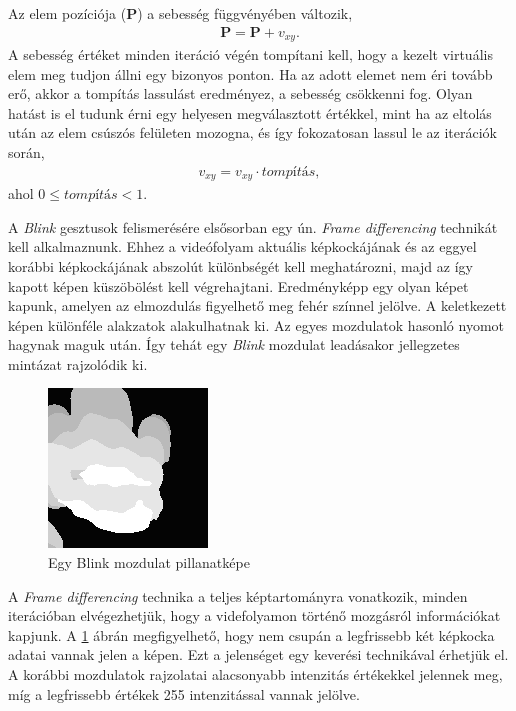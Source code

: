 Az elem pozíciója ($\boldsymbol P$) a sebesség függvényében változik,
\begin{align*}
  \boldsymbol P = \boldsymbol P+v_{xy}.
\end{align*}
A sebesség értéket minden iteráció végén tompítani kell, hogy a kezelt virtuális elem meg tudjon állni egy bizonyos ponton. Ha az adott elemet nem éri tovább erő, akkor a tompítás lassulást eredményez, a sebesség csökkenni fog. Olyan hatást is el tudunk érni egy helyesen megválasztott értékkel, mint ha az eltolás után az elem csúszós felületen mozogna, és így fokozatosan lassul le az iterációk során,
\begin{align*}
  v_{xy} = v_{xy} \cdot \textit{tompítás},
\end{align*}
ahol $0 \leq \textit{tompítás} < 1$.


A \textit{Blink} gesztusok felismerésére elsősorban egy ún. \textit{Frame differencing} technikát kell alkalmaznunk.
Ehhez a videófolyam aktuális képkockájának és az eggyel korábbi képkockájának abszolút különbségét kell meghatározni, majd az így kapott képen küszöbölést kell végrehajtani. Eredményképp egy olyan képet kapunk, amelyen az elmozdulás figyelhető meg fehér színnel jelölve. A keletkezett képen különféle alakzatok alakulhatnak ki. Az egyes mozdulatok hasonló nyomot hagynak maguk után. Így tehát egy \textit{Blink} mozdulat leadásakor jellegzetes mintázat rajzolódik ki.

\begin{figure}[h]
\centering
\includegraphics[scale=1.6]{images/Grab_screenshot.png}
\caption{Egy Blink mozdulat pillanatképe}
\label{fig:blink}
\end{figure}

A \textit{Frame differencing} technika a teljes képtartományra vonatkozik, minden iterációban elvégezhetjük, hogy a videfolyamon történő mozgásról információkat kapjunk. A \ref{fig:blink} ábrán megfigyelhető, hogy nem csupán a legfrissebb két képkocka adatai vannak jelen a képen. Ezt a jelenséget egy keverési technikával érhetjük el. A korábbi mozdulatok rajzolatai alacsonyabb intenzitás értékekkel jelennek meg, míg a legfrissebb értékek 255 intenzitással vannak jelölve.

